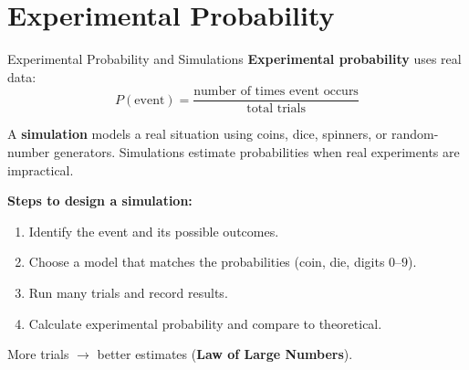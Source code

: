 \section{Experimental Probability}

\begin{quickReview}{Experimental Probability and Simulations}
\textbf{Experimental probability} uses real data:
$$P(\text{event}) = \frac{\text{number of times event occurs}}{\text{total trials}}$$

A \textbf{simulation} models a real situation using coins, dice, spinners, or random-number generators. Simulations estimate probabilities when real experiments are impractical.

\textbf{Steps to design a simulation:}
\begin{enumerate}[leftmargin=*]
    \item Identify the event and its possible outcomes.
    \item Choose a model that matches the probabilities (coin, die, digits $0$--$9$).
    \item Run many trials and record results.
    \item Calculate experimental probability and compare to theoretical.
\end{enumerate}

More trials $\rightarrow$ better estimates (\textbf{Law of Large Numbers}).
\end{quickReview}

